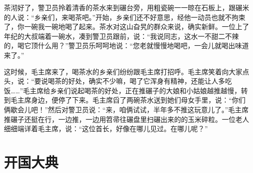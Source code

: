 \documentclass[12pt,UTF-8,openany]{ctexbook}
\begin{document}
\begin{Large}
    茶沏好了，警卫员拎着清香的茶水来到碾台旁，用粗瓷碗一一晾在石板上，跟碾米的人说：“乡亲们，来喝茶吧。”开始，乡亲们还不好意思，经他一动员也就不拘束了，你一碗我一碗地喝了起来。茶水对这山旮旯的群众来说，确实新鲜。一位上了年纪的大叔端着一碗水，凑到警卫员跟前，说：“我说同志，这水一不甜二不辣的，喝它顶什么用？”警卫员乐呵呵地说：“您老就慢慢地喝吧，一会儿就喝出味道来了。”
    
    这时候，毛主席来了，喝茶水的乡亲们纷纷跟毛主席打招呼。毛主席笑着向大家点头，说：“要说喝茶的好处，确实不少嘛，喝了它浑身有精神，还能让人多吃饭……”毛主席给乡亲们说起喝茶的好处，正在推碾子的大娘和小姑娘越推越慢，转到毛主席身边，便停了下来。毛主席舀了两碗茶水送到她们母女手里，说：“你们俩歇会儿吧！”然后对警卫员说：“来，咱俩试试，半年多不推这玩意儿了。”毛主席推碾子还挺在行，一边推，一边用笤帚往碾盘里扫碾出来的的玉米碎粒。一位老人细细端详着毛主席，说：“这位首长，好像在哪儿见过。在哪儿呢？”
    
\end{Large}

\chapter{开国大典}
\end{document}
